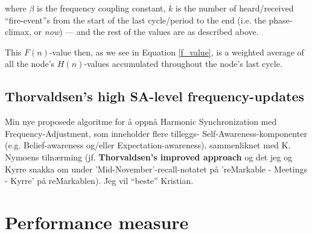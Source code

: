 	where $\beta$ is the frequency coupling constant, $k$ is the number of heard/received ``fire-event''s from the start of the last cycle/period to the end (i.e. the phase-climax, or \textit{now}) — and the rest of the values are as described above.
	
	This $F(n)$-value then, as we see in Equation \eqref{f_value}, is a weighted average of all the node's $H(n)$-values accumulated throughout the node's last cycle.
	
	
	
	
	
	\subsection{Thorvaldsen's high SA-level frequency-updates}
	
	Min nye proposede algoritme for å oppnå Harmonic Synchronization med Frequency-Adjustment, som inneholder flere tilleggs- Self-Awareness-komponenter (e.g. Belief-awareness og/eller Expectation-awareness), sammenliknet med K. Nymoens tilnærming (jf. \textbf{Thorvaldsen's improved approach} og det jeg og Kyrre snakka om under 'Mid-November'-recall-notatet på 'reMarkable -\> Meetings -\> Kyrre' på reMarkablen). Jeg vil ``beste'' Kristian.





\section{Performance measure}
\label{sec:performance_measure}
